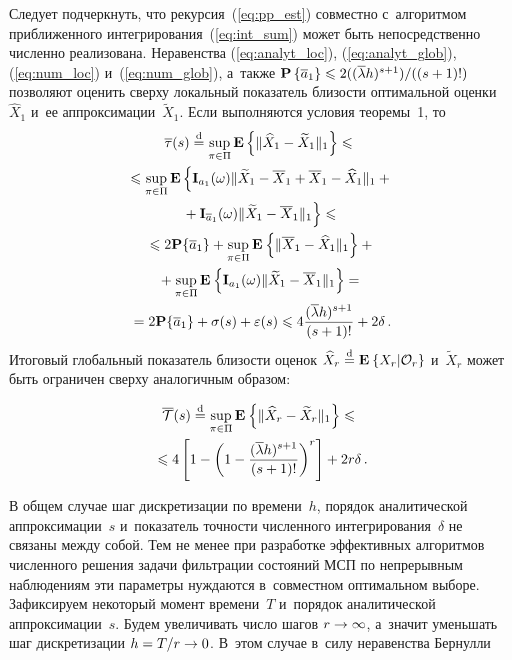 \begin{multicols}{2}
 Следует подчеркнуть, что рекурсия~(\ref{eq:pp_est}) совместно с~алгоритмом 
 приближенного интегрирования~(\ref{eq:int_sum}) может быть непосредственно 
 численно реализована.
 Неравенства (\ref{eq:analyt_loc}), (\ref{eq:analyt_glob}), (\ref{eq:num_loc}) 
и~(\ref{eq:num_glob}), а~также 
 $\mathbf{P}\left\{\overline{a}_1\right\}
 \hm\leqslant 2 ({(\overline{\lambda}h)^{s+1}})/((s+1)!)$
 позволяют оценить сверху локальный показатель близости оптимальной 
 оценки~$\widehat{X}_1$ и~ее аппроксимации~$\widetilde{X}_1$. 
 Если выполняются условия теоремы~1, то
 \begin{multline*}
 \overline{\tau}(s) \stackrel{\mathrm{d}}{=} \sup\limits_{\pi \in \Pi}
 \mathbf{E}\left\{\|\widehat{X}_1 - \widetilde{X}_1\|_1\right\} \leqslant  {}\\ 
{} \leqslant \sup\limits_{\pi \in \Pi}
\mathbf{E}\left\{\mathbf{I}_{a_1}(\omega)\| 
 \widetilde{X}_1-\overline{X}_{1}+\overline{X}_{1}-\widehat{X}_1
 \|_1+{}\right.\\
\left. {}+\mathbf{I}_{\overline{a}_1}(\omega)\|\widetilde{X}_1- \overline{X}_{1}\|_1\right\} 
 \leqslant {} \\ 
 {}\leqslant
 2\mathbf{P}\{\overline{a}_1\}+
 \sup\limits_{\pi \in \Pi}\mathbf{E}_{  }\left\{ \mathop{\|\overline{X}_{1}-
 \widehat{X}_1\|_1} \right\}+{}\\
 {}+\sup_{\pi \in \Pi}
 \mathbf{E}_{  }\left\{ \mathop{\mathbf{I}_{a_1}(\omega)\|\widetilde{X}_1-\overline{X}_{1}\|_1} \right\} ={} \\
 {} =
 2\mathbf{P}\{\overline{a}_1\}+\sigma(s)+\varepsilon(s) \leqslant 4
 \displaystyle\frac{\displaystyle (\overline{\lambda}h)^{s+1}\mathstrut}{\displaystyle (s+1)!\mathstrut} + 2\delta\,.
 \end{multline*}
 Итоговый глобальный показатель близости оценок 
 $\widehat{X}_r \stackrel{\mathrm{d}}{=} \mathbf{E}_{  }\left\{ \mathop{X_r|\mathcal{O}_r} \right\}$ и~$\widetilde{X}_r$ 
 может быть ограничен сверху аналогичным образом:

 \vspace*{-4pt}
 
 \noindent
 \begin{multline*}
 \overline{\mathcal{T}}(s) \stackrel{\mathrm{d}}{=} \sup\limits_{\pi \in \Pi}
 \mathbf{E}_{  }\left\{ \mathop{\|\widehat{X}_r - \widetilde{X}_r\|_1} \right\} \leqslant {}\\
 {}\leqslant  
 4
\left[ 1-\left(1-\displaystyle\frac{\displaystyle (\overline{\lambda}h)^{s+1}\mathstrut}{\displaystyle (s+1)!\mathstrut}\right)^r
\right] + 2r\delta\,.
 \end{multline*}
 
 \vspace*{-2pt}
 
 \noindent
 В общем случае шаг дискретизации по времени~$h$, 
 порядок аналитической аппроксимации~$s$ и~показатель точности численного 
 интегрирования~$\delta$  не связаны между собой. Тем не менее при 
 разработке эффективных алгоритмов численного решения задачи фильтрации 
 состояний МСП по непрерывным наблюдениям эти параметры нуждаются в~совместном 
 оптимальном выборе. Зафиксируем некоторый момент времени~$T$ и~порядок 
 аналитической аппроксимации~$s$. Будем увеличивать число шагов $r \hm\to \infty$, 
 а~значит  уменьшать шаг дискретизации $h\hm = {T}/{r} \hm\to 0$.  
 В~этом случае в~силу неравенства Бернулли
 

\end{multicols}
